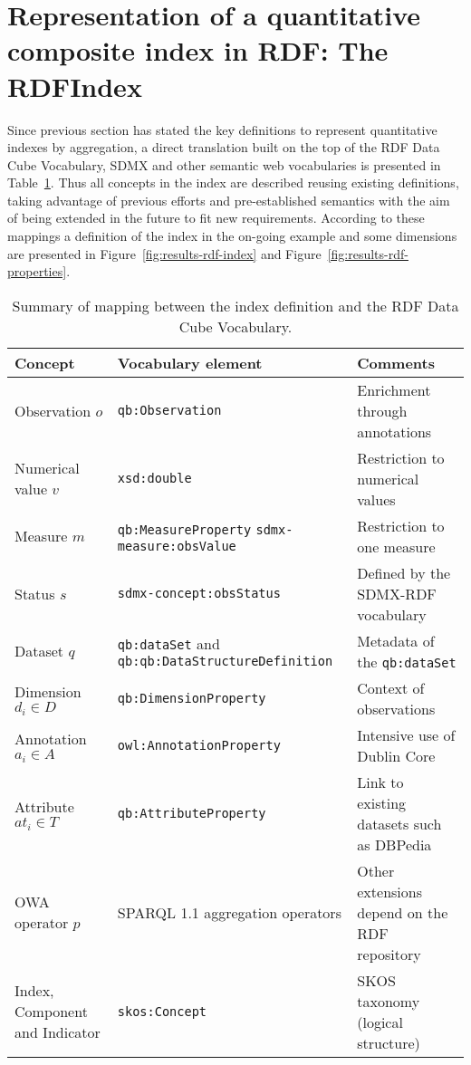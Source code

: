 \section{Representation of a quantitative composite index in RDF: The RDFIndex}
Since previous section has stated the key definitions to represent quantitative indexes by aggregation, a direct translation built 
on the top of the RDF Data Cube Vocabulary, SDMX and other semantic web vocabularies is presented in Table~\ref{index-to-rdf}. Thus 
all concepts in the index are described reusing existing definitions, taking advantage of previous efforts and pre-established semantics 
with the aim of being extended in the future to fit new requirements. According to these mappings a definition of the index in the 
on-going example and some dimensions are presented in Figure~\ref{fig:results-rdf-index} and Figure~\ref{fig:results-rdf-properties}.


\begin{table}[!htb]
\renewcommand{\arraystretch}{1.3}
\scriptsize
\begin{center}
\begin{tabular}{|p{3cm}||p{4.8cm}|p{4.5cm}|}
\hline
  \textbf{Concept} & \textbf{Vocabulary element} &  \textbf{Comments}  \\  \hline
   Observation $o$ & \texttt{qb:Observation} &  Enrichment through annotations\\ \hline
   Numerical value $v$ & \texttt{xsd:double} & Restriction to numerical values  \\ \hline
   Measure $m$ & \texttt{qb:MeasureProperty} \texttt{sdmx-measure:obsValue} & Restriction to one measure \\ \hline
   Status $s$ & \texttt{sdmx-concept:obsStatus} & Defined by the SDMX-RDF vocabulary\\ \hline
   Dataset $q$ & \texttt{qb:dataSet} and \texttt{qb:qb:DataStructureDefinition} &  Metadata of the \texttt{qb:dataSet}\\ \hline
   Dimension $d_i \in D$ & \texttt{qb:DimensionProperty} & Context of observations \\ \hline
   Annotation $a_i \in A$ & \texttt{owl:AnnotationProperty} &  Intensive use of Dublin Core\\ \hline
   Attribute $at_i \in T$ & \texttt{qb:AttributeProperty} & Link to existing datasets such as DBPedia \\ \hline
   OWA operator $p$ &  SPARQL 1.1 aggregation operators & Other extensions depend on the RDF repository \\ \hline
   Index, Component and Indicator & \texttt{skos:Concept} & SKOS taxonomy (logical structure) \\ \hline
  \hline
  \end{tabular}
  \caption{Summary of mapping between the index definition and the RDF Data Cube Vocabulary.}
  \label{index-to-rdf}
  \end{center}
\end{table} 

